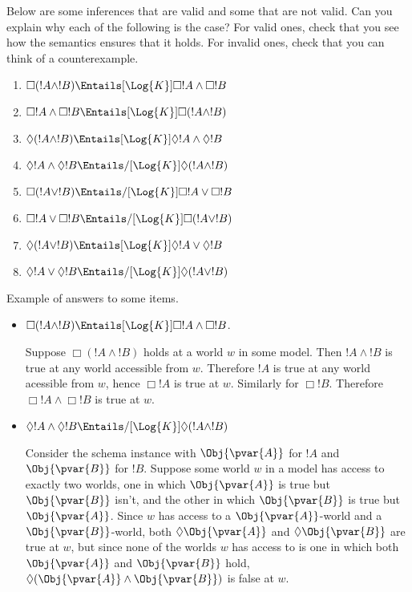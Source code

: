 \documentclass[../../../include/open-logic-section]{subfiles}
\begin{document}
\begin{prob}
    Below are some inferences that are valid and some that are not 
    valid. Can you explain why each of the following is the case? 
    For valid ones, check that you see how the semantics ensures that it holds. 
    For invalid ones, check that you can think of a counterexample.
    \begin{enumerate}
        \item $\Box(!A\land!B) \Entails[\Log{K}] \Box !A \land \Box !B$
        \item $\Box !A \land \Box !B \Entails[\Log{K}] \Box(!A \land !B)$
        \item $\Diamond(!A\land!B) \Entails[\Log{K}] \Diamond !A \land \Diamond !B$
        \item $\Diamond!A\land\Diamond!B \Entails/[\Log{K}] \Diamond (!A \land !B)$
        \item $\Box(!A\lor!B) \Entails/[\Log{K}] \Box !A \lor \Box !B$
        \item $\Box !A \lor \Box !B \Entails/[\Log{K}] \Box (!A \lor !B)$
        \item $\Diamond(!A\lor!B) \Entails[\Log{K}] \Diamond !A \lor \Diamond !B$
        \item $\Diamond !A \lor \Diamond !B \Entails/[\Log{K}] \Diamond(!A\lor!B)$ 
    \end{enumerate}

    \begin{ans}
    Example of answers to some items.
    \begin{itemize}
    \item $\Box(!A\land!B) \Entails[\Log{K}] \Box !A \land \Box !B$.
    
        Suppose $\Box(!A\land!B)$ holds at a world $w$ in some model.
        Then $!A\land!B$ is true at any world accessible from $w$.
        Therefore $!A$ is true at any world acessible from $w$, hence
        $\Box!A$ is true at $w$. Similarly for $\Box!B$. Therefore
        $\Box !A \land \Box !B$ is true at $w$.

    \item $\Diamond!A\land\Diamond!B \Entails/[\Log{K}] \Diamond (!A \land !B)$
    
        Consider the schema instance with $\Obj{\pvar{A}}$ for $!A$ 
        and $\Obj{\pvar{B}}$ for $!B$. Suppose some world $w$ in a 
        model has access to exactly two worlds, one in which $\Obj{\pvar{A}}$
        is true but $\Obj{\pvar{B}}$ isn't, and the other in which 
        $\Obj{\pvar{B}}$ is true but $\Obj{\pvar{A}}$. Since $w$ has
        access to a $\Obj{\pvar{A}}$-world and a $\Obj{\pvar{B}}$-world,
        both $\Diamond\Obj{\pvar{A}}$ and $\Diamond\Obj{\pvar{B}}$ 
        are true at $w$, but since none of the worlds $w$ has access
        to is one in which both $\Obj{\pvar{A}}$ and $\Obj{\pvar{B}}$
        hold, $\Diamond (\Obj{\pvar{A}} \land \Obj{\pvar{B}})$ is false at $w$.


\end{itemize}
\end{ans}
\end{prob}
\end{document}
